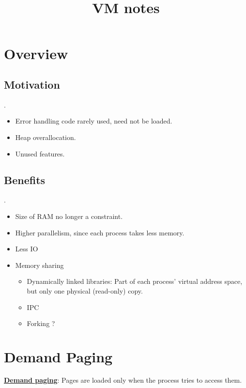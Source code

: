 \documentclass{amsart}
\begin{document}
\newcommand{\is}[2]{\textbf{\underline{#1}}: {#2}

}
\newcommand{\si}[2]{\textit{#1}: {#2}

}
\title{VM notes}
\maketitle
    \section{Overview}
    \subsection{Motivation}.
    \begin{itemize}
        \item Error handling code rarely used, need not be loaded.
        \item Heap overallocation.
        \item Unused features.
    \end{itemize}

    \subsection{Benefits}.
    \begin{itemize}
        \item Size of RAM no longer a constraint.
        \item Higher parallelism, since each process takes less memory.
        \item Less IO
        \item Memory sharing \begin{itemize}
            \item Dynamically linked libraries: Part of each process' virtual address space, but only one physical (read-only) copy.
            \item IPC
            \item Forking ?
        \end{itemize}
    \end{itemize}

    \section{Demand Paging}

    \is{Demand paging}{
        Pages are loaded only when the process tries to access them.
    }
\end{document}
